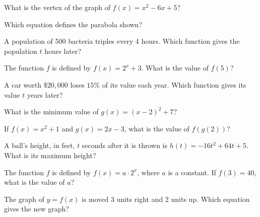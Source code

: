 \begin{exo}{}
What is the vertex of the graph of $f(x)=x^2-6x+5$?
\end{exo}
\begin{exo}{}
Which equation defines the parabola shown?
\end{exo}
\begin{exo}{}
A population of 500 bacteria triples every 4 hours. Which function gives the population $t$ hours later?
\end{exo}
\begin{exo}{\sprtag}
The function $f$ is defined by $f(x)=2^x+3$. What is the value of $f(5)$?
\end{exo}
\begin{exo}{}
A car worth $\$20{,}000$ loses $15\%$ of its value each year. Which function gives its value $t$ years later?
\end{exo}
\begin{exo}{\sprtag}
What is the minimum value of $g(x)=(x-2)^2+7$?
\end{exo}
\begin{exo}{}
If $f(x)=x^2+1$ and $g(x)=2x-3$, what is the value of $f(g(2))$?
\end{exo}
\begin{exo}{}
A ball's height, in feet, $t$ seconds after it is thrown is $h(t)=-16t^2+64t+5$. What is its maximum height?
\end{exo}
\begin{exo}{\sprtag}
The function $f$ is defined by $f(x)=a\cdot2^x$, where $a$ is a constant. If $f(3)=40$, what is the value of $a$?
\end{exo}
\begin{exo}{}
The graph of $y=f(x)$ is moved 3 units right and 2 units up. Which equation gives the new graph?
\end{exo}
